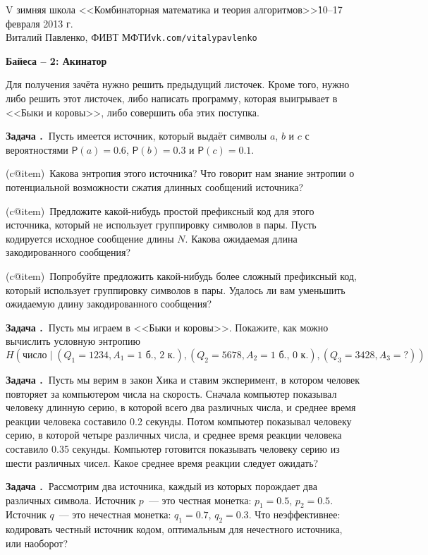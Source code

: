 \documentclass[12pt,a4paper]{article}
\makeatletter
\newcommand*{\ralph}[1]{\expandafter\rralph\csname c@#1\endcsname}
\newcommand*{\rralph}[1]%
{\ifcase #1\or а\or б\or в\or г\or д\or е\or ж\or з\or и\or
к\or л\or м\or н\or о\or п\or р\or с\or т\or у\or
ф\or х\or ц\or ч\or ш\or щ\or э\or ю\or
я\fi}
\newcounter{problem}
\newcounter{item}
\newcommand*{\z}{\par\medskip\addtocounter{problem}{1}\setcounter{item}{0}
\textbf{Задача \arabic{problem}.\ }}
\newcommand*{\ite}{\par\addtocounter{item}{1}(\ralph{item})\ }
\newcommand{\myP}[0]{\mathsf{P}}
\makeatother
\begin{document}
\pagestyle{empty}

{\footnotesize\begin{tabbing}V зимняя школа <<Комбинаторная математика и теория алгоритмов>>\`10--17 февраля 2013 г.\\
Виталий Павленко, ФИВТ МФТИ\`\texttt{vk.com/vitalypavlenko}\end{tabbing}}


\begin{center}
\vskip 24pt
{\bf{} Байеса -- 2: Акинатор}
\end{center}

Для получения зачёта нужно решить предыдущий листочек. Кроме того, нужно либо решить этот листочек, либо написать программу, которая выигрывает в <<Быки и коровы>>, либо совершить оба этих поступка.

\z Пусть имеется источник, который выдаёт символы $a$, $b$ и $c$ с вероятностями $\myP(a) = 0.6$, $\myP(b) = 0.3$ и $\myP(c) = 0.1$.
\ite Какова энтропия этого источника? Что говорит нам знание энтропии о потенциальной возможности сжатия длинных сообщений источника?
\ite Предложите какой-нибудь простой префиксный код для этого источника, который не использует группировку символов в пары. Пусть кодируется исходное сообщение длины $N$. Какова ожидаемая длина закодированного сообщения?
\ite Попробуйте предложить какой-нибудь более сложный префиксный код, который использует группировку символов в пары. Удалось ли вам уменьшить ожидаемую длину закодированного сообщения?

\z Пусть мы играем в <<Быки и коровы>>. Покажите, как можно вычислить условную энтропию 
$$ H(\text{число} \mid (Q_1 = 1234, A_1 = \text{1 б., 2 к.}), (Q_2 = 5678, A_2 = \text{1 б., 0 к.}), (Q_3 = 3428, A_3 = \text{?})). $$

\z Пусть мы верим в закон Хика и ставим эксперимент, в котором человек повторяет за компьютером числа на скорость. Сначала компьютер показывал человеку длинную серию, в которой всего два различных числа, и среднее время реакции человека составило 0.2 секунды. Потом компьютер показывал человеку серию, в которой четыре различных числа, и среднее время реакции человека составило 0.35 секунды. Компьютер готовится показывать человеку серию из шести различных чисел. Какое среднее время реакции следует ожидать?

\z Рассмотрим два источника, каждый из которых порождает два различных символа. Источник $p$~--- это честная монетка: $p_1 = 0.5$, $p_2 = 0.5$. Источник $q$~--- это нечестная монетка: $q_1 = 0.7$, $q_2 = 0.3$. Что неэффективнее: кодировать честный источник кодом, оптимальным для нечестного источника, или наоборот?
\end{document}
